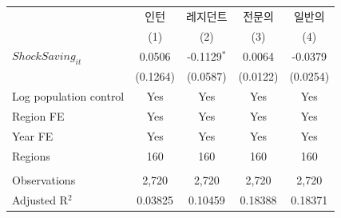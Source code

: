 \begingroup
\centering
\begin{tabular}{lcccc}
   \toprule
                          & 인턴     & 레지던트      & 전문의   & 일반의 \\   
                          & (1)      & (2)           & (3)      & (4)\\  
   \midrule 
   $ShockSaving_{it}$     & 0.0506   & -0.1129$^{*}$ & 0.0064   & -0.0379\\   
                          & (0.1264) & (0.0587)      & (0.0122) & (0.0254)\\   
   Log population control & Yes      & Yes           & Yes      & Yes\\  
   Region FE              & Yes      & Yes           & Yes      & Yes\\  
   Year FE                & Yes      & Yes           & Yes      & Yes\\  
   Regions                & 160      & 160           & 160      & 160\\  
    \\
   Observations           & 2,720    & 2,720         & 2,720    & 2,720\\  
   Adjusted R$^2$         & 0.03825  & 0.10459       & 0.18388  & 0.18371\\  
   \bottomrule
\end{tabular}
\par\endgroup
